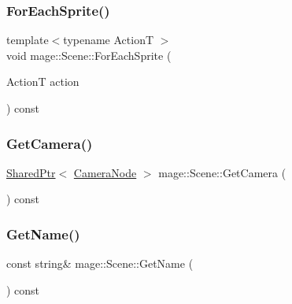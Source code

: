 \hypertarget{classmage_1_1_scene_ae181b160f9a75593db9f551c9c233329}{}\label{classmage_1_1_scene_ae181b160f9a75593db9f551c9c233329} 
\subsubsection{\texorpdfstring{For\+Each\+Sprite()}{ForEachSprite()}}
{\footnotesize\ttfamily template$<$typename ActionT $>$ \\
void mage\+::\+Scene\+::\+For\+Each\+Sprite (\begin{DoxyParamCaption}\item[{ActionT}]{action }\end{DoxyParamCaption}) const}

\hypertarget{classmage_1_1_scene_ad77fe833ca79bf862e1929dfdeb0f1fd}{}\label{classmage_1_1_scene_ad77fe833ca79bf862e1929dfdeb0f1fd} 
\subsubsection{\texorpdfstring{Get\+Camera()}{GetCamera()}}
{\footnotesize\ttfamily \hyperlink{namespacemage_a1e01ae66713838a7a67d30e44c67703e}{Shared\+Ptr}$<$ \hyperlink{classmage_1_1_camera_node}{Camera\+Node} $>$ mage\+::\+Scene\+::\+Get\+Camera (\begin{DoxyParamCaption}{ }\end{DoxyParamCaption}) const\hspace{0.3cm}{\ttfamily [noexcept]}}

\hypertarget{classmage_1_1_scene_a6afd25c30d08eb579eb430af49cf8fc0}{}\label{classmage_1_1_scene_a6afd25c30d08eb579eb430af49cf8fc0} 
\subsubsection{\texorpdfstring{Get\+Name()}{GetName()}}
{\footnotesize\ttfamily const string\& mage\+::\+Scene\+::\+Get\+Name (\begin{DoxyParamCaption}{ }\end{DoxyParamCaption}) const\hspace{0.3cm}{\ttfamily [noexcept]}}

